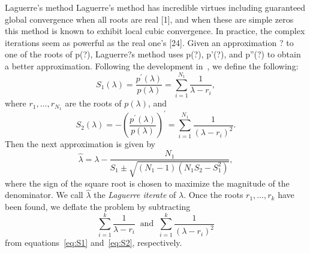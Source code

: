 \documentclass[final,hyperref={pdfpagelabels=false}]{beamer}
\begin{document}
	\begin{columns}[t]
		\begin{column}{.48\linewidth}
				\begin{block}{\large Laguerre's method}
					Laguerre's method has incredible virtues including guaranteed global
					convergence when all roots are real [1], and when these are simple zeros this method
					is known to exhibit local cubic convergence. In practice, the complex iterations seem
					as powerful as the real one's [24]. Given an approximation ? to one of the roots of p(?), Laguerre?s method uses p(?), p'(?), and p''(?) to obtain a better approximation. Following the development in~\cite{Parlett1964}, we define the following:
				\begin{equation}\label{eq:S1}
				S_{1}(\lambda)=\frac{p^{'}(\lambda)}{p(\lambda)}=\underset{i=1}{\overset{N_{1}}\sum}\frac{1}{\lambda-r_{i}},
				\end{equation}
				where $r_{1},\ldots,r_{N_{1}}$ are the roots of $p(\lambda)$, and
				\begin{equation}\label{eq:S2}
				S_{2}(\lambda)=-\left(\frac{p^{'}(\lambda)}{p(\lambda)}\right)^{'}=\underset{i=1}{\overset{N_{1}}\sum}\frac{1}{(\lambda-r_{i})^{2}}.
				\end{equation}
				Then the next approximation is given by
				\begin{equation}\label{eq:lit}
				\hat{\lambda}=\lambda-\frac{N_{1}}{S_{1}\pm\sqrt{(N_{1}-1)(N_{1}S_{2}-S_{1}^{2})}},
				\end{equation}
				where the sign of the square root is chosen to maximize the magnitude of the denominator. We call $\hat{\lambda}$ the \emph{Laguerre iterate} of $\lambda$. Once the roots $r_{1},\ldots,r_{k}$ have been found, we deflate the problem by subtracting
				\[
				\underset{i=1}{\overset{k}\sum}\frac{1}{\lambda-r_{i}}~\text{ and }~\underset{i=1}{\overset{k}\sum}\frac{1}{(\lambda-r_{i})^{2}}
				\]
				from equations~\eqref{eq:S1} and~\eqref{eq:S2}, respectively.
				

\end{block}
\end{column}
\end{columns}
\end{document}
